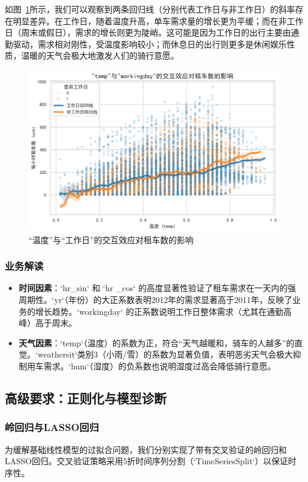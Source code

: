 \documentclass[UTF8,a4paper,10pt]{ctexart}
\begin{document}
如图~\ref{fig:interaction}所示，我们可以观察到两条回归线（分别代表工作日与非工作日）的斜率存在明显差异。在工作日，随着温度升高，单车需求量的增长更为平缓；而在非工作日（周末或假日），需求的增长则更为陡峭。这可能是因为工作日的出行主要由通勤驱动，需求相对刚性，受温度影响较小；而休息日的出行则更多是休闲娱乐性质，温暖的天气会极大地激发人们的骑行意愿。

\begin{figure}[H]
    \centering
    \includegraphics[width=0.8\linewidth]{pic/temp_workingday_interaction.png}
    \caption{“温度”与“工作日”的交互效应对租车数的影响}
    \label{fig:interaction}
\end{figure}

\subsubsection{业务解读}
\begin{itemize}
    \item \textbf{时间因素}：`hr\_sin` 和 `hr
\_cos` 的高度显著性验证了租车需求在一天内的强周期性。`yr`（年份）的大正系数表明2012年的需求显著高于2011年，反映了业务的增长趋势。`workingday` 的正系数说明工作日整体需求（尤其在通勤高峰）高于周末。
    \item \textbf{天气因素}：`temp`（温度）的系数为正，符合“天气越暖和，骑车的人越多”的直觉。`weathersit`类别3（小雨/雪）的系数为显著负值，表明恶劣天气会极大抑制用车需求。`hum`（湿度）的负系数也说明湿度过高会降低骑行意愿。
\end{itemize}

\subsection{高级要求：正则化与模型诊断}
\subsubsection{岭回归与LASSO回归}
为缓解基础线性模型的过拟合问题，我们分别实现了带有交叉验证的岭回归和LASSO回归。交叉验证策略采用5折时间序列分割（`TimeSeriesSplit`）以保证时序性。
\end{document}
